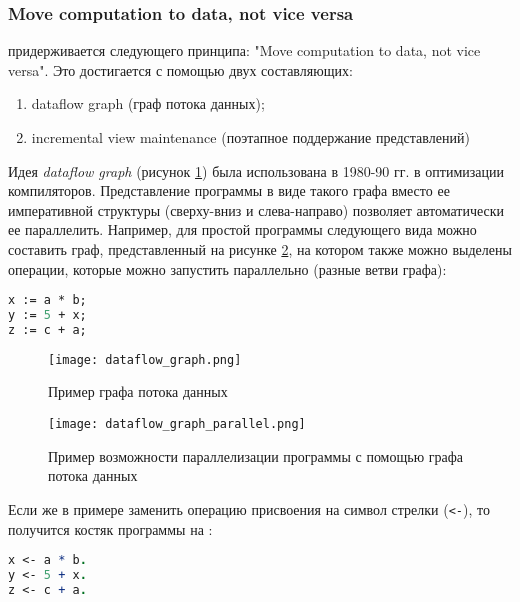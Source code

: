 \subsubsection{Move computation to data, not vice versa}
\label{sec:technology:data_to_computation}

\LB придерживается следующего принципа: "Move computation to data, not vice versa". Это достигается с помощью двух составляющих:

\begin{enumerate}
  \item dataflow graph (граф потока данных);
  \item incremental view maintenance (поэтапное поддержание представлений)
\end{enumerate}

Идея \emph{dataflow graph} (рисунок \ref{fig:technology:data_to_computation:dataflow_graph}) была использована в 1980-90 гг. в оптимизации компиляторов. Представление программы в виде такого графа вместо ее императивной структуры (сверху-вниз и слева-направо) позволяет автоматически ее параллелить. Например, для простой программы следующего вида можно составить граф, представленный на рисунке \ref{fig:technology:data_to_computation:dataflow_graph_parallel}, на котором также можно выделены операции, которые можно запустить параллельно (разные ветви графа):

\begin{lstlisting}[language=Pascal]
x := a * b;
y := 5 + x;
z := c + a;
\end{lstlisting}

\begin{figure}
	\centering
	\texttt{[image: dataflow\_graph.png]}
	\caption{Пример графа потока данных}
	\label{fig:technology:data_to_computation:dataflow_graph}
\end{figure}

\begin{figure}
	\centering
	\texttt{[image: dataflow\_graph\_parallel.png]}
	\caption{Пример возможности параллелизации программы с помощью графа потока данных}
	\label{fig:technology:data_to_computation:dataflow_graph_parallel}
\end{figure}

Если же в примере заменить операцию присвоения на символ стрелки (\lstinline{<-}), то получится костяк программы на \logiql:

\begin{lstlisting}[language=Prolog]
x <- a * b.
y <- 5 + x.
z <- c + a.
\end{lstlisting}

